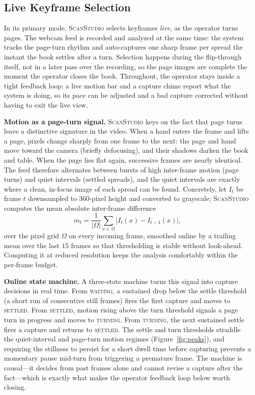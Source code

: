 \documentclass{article}
\newcommand{\sys}{\textsc{ScanStudio}\xspace}
\begin{document}
\subsection{Live Keyframe Selection}
\label{sec:live}

In its primary mode, \sys selects keyframes \emph{live}, as the operator turns
pages. The webcam feed is recorded and analyzed at the same time: the system
tracks the page-turn rhythm and auto-captures one sharp frame per spread the
instant the book settles after a turn. Selection happens during the flip-through
itself, not in a later pass over the recording, so the page images are complete the
moment the operator closes the book. Throughout, the operator stays inside 
a tight feedback loop: a live motion bar and a capture chime
report what the system is doing, so its pace can be adjusted and a bad capture
corrected without having to exit the live view.

\noindent\textbf{Motion as a page-turn signal.}
\sys keys on the fact that page turns leave a distinctive signature in the video.
When a hand enters the frame and lifts a page, pixels change sharply from one
frame to the next: the page and hand move toward the camera (briefly defocusing),
and their shadows darken the book and table. When the page lies flat again,
successive frames are nearly identical. The feed therefore alternates between
bursts of high inter-frame motion (page turns) and quiet intervals (settled
spreads), and the quiet intervals are exactly where a clean, in-focus image of
each spread can be found. Concretely, let $I_t$ be frame $t$ downsampled to
360-pixel height and converted to grayscale; \sys computes the mean absolute
inter-frame difference
\begin{equation}
    m_t = \frac{1}{|\Omega|} \sum_{x \in \Omega} \bigl| I_t(x) - I_{t-1}(x) \bigr|,
    \label{eq:motion}
\end{equation}
over the pixel grid $\Omega$ on every incoming frame, smoothed online by a
trailing mean over the last $15$ frames so that thresholding is stable without
look-ahead. Computing it at reduced resolution keeps the analysis comfortably
within the per-frame budget.

\noindent\textbf{Online state machine.}
A three-state machine turns this signal into capture decisions in real time. From
\textsc{waiting}, a sustained drop below the settle threshold (a short run of
consecutive still frames) fires the first capture and moves to \textsc{settled}.
From \textsc{settled}, motion rising above the turn threshold signals a page turn
in progress and moves to \textsc{turning}. From \textsc{turning}, the next
sustained settle fires a capture and returns to \textsc{settled}. The settle and
turn thresholds straddle the quiet-interval and page-turn motion regimes
(Figure~\ref{fig:peaks}), and requiring the stillness to persist for a short dwell
time before capturing prevents a momentary pause mid-turn from triggering a
premature frame. The machine is causal---it decides from past frames alone and
cannot revise a capture after the fact---which is exactly what makes the operator
feedback loop below worth closing.
\end{document}
